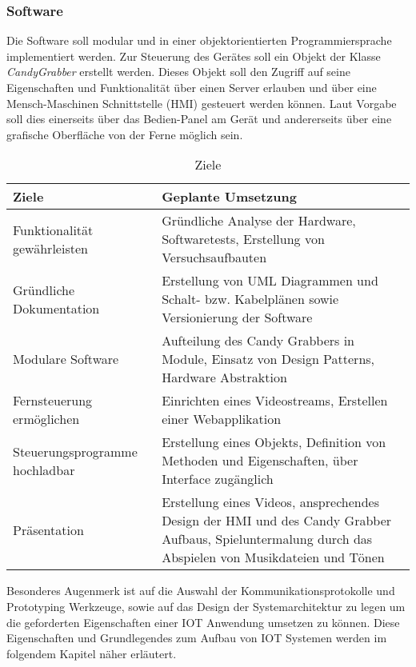 \documentclass[BMR,Bachelor,ngerman]{twbook}%
\begin{document}
\subsubsection{Software}
Die Software soll modular und in einer objektorientierten Programmiersprache implementiert werden. Zur Steuerung des Gerätes soll ein Objekt der Klasse \emph{CandyGrabber} erstellt werden. Dieses Objekt soll den Zugriff auf seine Eigenschaften und Funktionalität über einen Server erlauben und über eine Mensch-Maschinen Schnittstelle (\ac{HMI}) gesteuert werden können. Laut Vorgabe soll dies einerseits über das Bedien-Panel am Gerät und andererseits über eine grafische Oberfläche von der Ferne möglich sein.
\begin{table}[H]
\caption{Ziele}
\label{tab:goals}
\centering
\begin{tabular}{| p{}| p{} |}\hline
\rowcolor[gray]{0.9}Ziele & Geplante Umsetzung \\\hline
Funktionalität gewährleisten & Gründliche Analyse der Hardware, Softwaretests, Erstellung von Versuchsaufbauten\\\hline
Gründliche Dokumentation & Erstellung von UML Diagrammen und Schalt- bzw. Kabelplänen sowie Versionierung der Software\\\hline
Modulare Software & Aufteilung des Candy Grabbers in Module, Einsatz von Design Patterns, Hardware Abstraktion \\\hline
Fernsteuerung ermöglichen & Einrichten eines Videostreams, Erstellen einer Webapplikation \\\hline
Steuerungsprogramme hochladbar& Erstellung eines Objekts, Definition von Methoden und Eigenschaften, über Interface zugänglich\\\hline
Präsentation & Erstellung eines Videos, ansprechendes Design der HMI und des Candy Grabber Aufbaus, Spieluntermalung durch das Abspielen von Musikdateien und Tönen\\\hline
\end{tabular}
\end{table}
Besonderes Augenmerk ist auf die Auswahl der Kommunikationsprotokolle und Prototyping Werkzeuge, sowie auf das Design der Systemarchitektur zu legen um die geforderten Eigenschaften einer \ac{IOT} Anwendung umsetzen zu können. Diese Eigenschaften und Grundlegendes zum Aufbau von \ac{IOT} Systemen werden im folgendem Kapitel näher erläutert.
\end{document}
